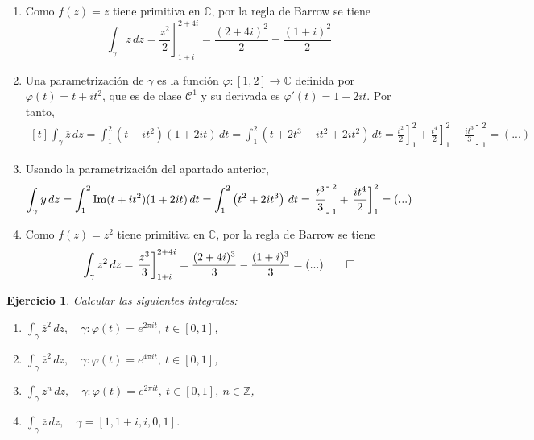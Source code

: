 \documentclass[11pt]{report}
\makeatletter
\renewenvironment{proof}[1][\proofname]{\par
  \pushQED{\qed}%
  \normalfont \topsep\z@skip %
  \trivlist
  \item[\hskip\labelsep
        \itshape
    #1\@addpunct{.}]\ignorespaces
}{%
  \popQED\endtrivlist\@endpefalse
}
\newcommand{\Z}{\mathbb Z}
\newcommand{\C}{\mathbb C}
\newtheorem{exercise}{Ejercicio}
\makeatother
\begin{document}
\begin{proof}
\hfill
\begin{enumerate}
    \item Como $f(z)=z$ tiene primitiva en $\C$, por la regla de Barrow se tiene
    \[\int_\gamma z \, dz = \left.\frac{z^2}{2}\right]_{1+i}^{2+4i} = \frac{(2+4i)^2}{2}-\frac{(1+i)^2}{2}\]
    \item Una parametrización de $\gamma$ es la función $\varphi \colon [1,2] \to \C$ definida por $\varphi(t)=t+it^2$, que es de clase $\mathcal{C}^1$ y su derivada es $\varphi'(t)=1+2it$. Por tanto,
    \[
    \begin{aligned}[t]
    \int_\gamma \overline{z} \, dz = \int_1^2 \left(t-it^2\right)\left(1+2it\right) \, dt = \int_1^2\left(t+2t^3-it^2+2it^2\right) \, dt =\left.\frac{t^2}{2}\right]_1^2+\left.\frac{t^4}{2}\right]_1^2+\left.\frac{it^3}{3}\right]_1^2= (...)   
    \end{aligned}
    \]
    \item Usando la parametrización del apartado anterior,
    \[\int_\gamma y \, dz = \int_1^2 \textup{Im}(t+it^2)(1+2it) \, dt = \int_1^2\left(t^2+2it^3\right) \, dt = \left.\frac{t^3}{3}\right]_1^2+\left.\frac{it^4}{2}\right]_1^2 = (...)\]
    \item Como $f(z)=z^2$ tiene primitiva en $\C$, por la regla de Barrow se tiene
    \[\int_\gamma z^2 \, dz = \left.\frac{z^3}{3}\right]_{1+i}^{2+4i} = \frac{(2+4i)^3}{3}-\frac{(1+i)^3}{3} = (...) \qedhere\]
\end{enumerate}
\end{proof}

\begin{exercise}
Calcular las siguientes integrales:
\begin{multicols}{2}
\begin{enumerate}
    \item $\displaystyle \int_\gamma \overline{z}^2 \, dz, \quad \gamma \colon \varphi(t) = e^{2\pi i t}, \ t \in [0,1]$,
    \item $\displaystyle \int_\gamma \overline{z}^2 \, dz, \quad \gamma \colon \varphi(t) = e^{4\pi i t}, \ t \in [0,1]$,
    \item $\displaystyle \int_\gamma z^n \, dz, \quad \gamma \colon \varphi(t) = e^{2\pi i t}, \ t \in [0,1], \ n \in \Z$,
    \item $\displaystyle \int_\gamma \overline{z} \, dz, \quad \gamma =[1,1+i,i,0,1]$.
\end{enumerate}
\end{multicols}
\end{exercise}
\end{document}
